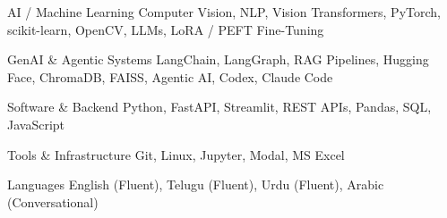 

\begin{cvskills}

  \cvskill
    {AI / Machine Learning}
    {Computer Vision, NLP, Vision Transformers, PyTorch, scikit-learn, OpenCV, LLMs, LoRA / PEFT Fine-Tuning}

  \cvskill
    {GenAI \& Agentic Systems}
    {LangChain, LangGraph, RAG Pipelines, Hugging Face, ChromaDB, FAISS, Agentic AI, Codex, Claude Code}

  \cvskill
    {Software \& Backend}
    {Python, FastAPI, Streamlit, REST APIs, Pandas, SQL, JavaScript}

  \cvskill
    {Tools \& Infrastructure}
    {Git, Linux, Jupyter, Modal, MS Excel}

  \cvskill
    {Languages}
    {English (Fluent), Telugu (Fluent), Urdu (Fluent), Arabic (Conversational)}

\end{cvskills}
